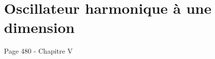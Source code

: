 \chapter{Oscillateur harmonique à une dimension}
\label{chapter:oscillateur_harmonique_une_dim}
Page 480 - Chapitre V
